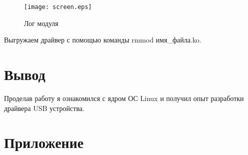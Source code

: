 \documentclass[a4paper]{article}
\begin{document}
\begin{figure}[h!]
\clearpage
\centering
\texttt{[image: screen.eps]} 
\caption{Лог модуля}
\end{figure} 

Выгружаем драйвер с помощью команды rmmod имя\_файла.ko.\\

\section{Вывод}

Проделав работу я ознакомился с ядром ОС Linux и получил опыт разработки драйвера USB устройства.

\section{Приложение}
\end{document}

